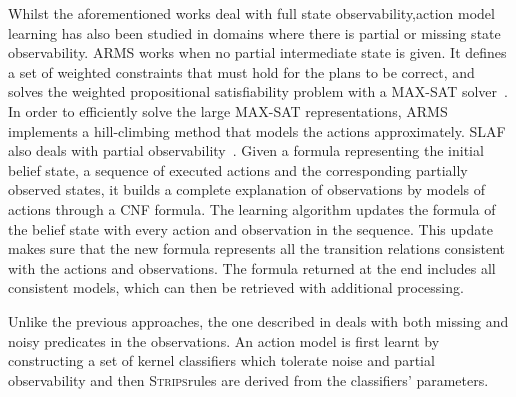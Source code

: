 \documentclass[3p,times]{elsarticle}
\newcommand{\strips}{\textsc{Strips}}     %
\begin{document}
Whilst the aforementioned works deal with full state observability,action model learning has also been studied in domains where there is partial or missing state observability. {\sf ARMS} works when no partial intermediate state is given. It defines a set of weighted constraints that must hold for the plans to be correct, and solves the weighted propositional satisfiability problem with a MAX-SAT solver~\cite{yang2007learning}. In order to efficiently solve the large MAX-SAT representations, {\sf ARMS} implements a hill-climbing method that models the actions approximately. %
{\sc SLAF} also deals with partial observability~\cite{amir:alearning:JAIR08}. Given a formula representing the initial belief state, a sequence of executed actions and the corresponding partially observed states, it builds a complete explanation of observations by models of actions through a CNF formula. The learning algorithm updates the formula of the belief state with every action and observation in the sequence. This update makes sure that the new formula represents all the transition relations consistent with the actions and observations. The formula returned at the end includes all consistent models, which can then be retrieved with additional processing.

Unlike the previous approaches, the one described in \cite{MouraoZPS12} deals with both missing and noisy predicates in the observations. An action model is first learnt by constructing a set of kernel classifiers which tolerate noise and partial observability and then \strips rules are derived from the classifiers' parameters.
\end{document}
